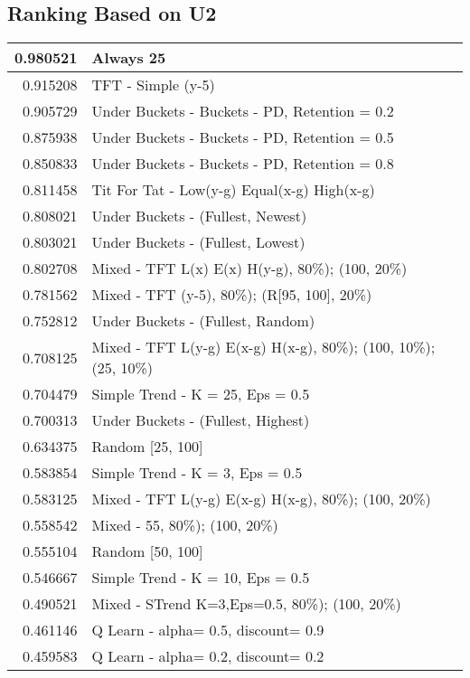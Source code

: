\begin{table}[!hbtp]
\subsection{Ranking Based on U2}
\begin{footnotesize}
\begin{tabular}{|r|l|}\hline  \label{U3results}
0.980521 & Always 25\\ \hline
0.915208 & TFT - Simple (y-5)\\ \hline
0.905729 & Under Buckets - Buckets - PD, Retention = 0.2\\ \hline
0.875938 & Under Buckets - Buckets - PD, Retention = 0.5\\ \hline
0.850833 & Under Buckets - Buckets - PD, Retention = 0.8\\ \hline
0.811458 & Tit For Tat - Low(y-g) Equal(x-g) High(x-g)\\ \hline
0.808021 & Under Buckets - (Fullest, Newest)\\ \hline
0.803021 & Under Buckets - (Fullest, Lowest)\\ \hline
0.802708 & Mixed - {TFT L(x) E(x) H(y-g), 80\%); (100, 20\%)}\\ \hline
0.781562 & Mixed - {TFT (y-5), 80\%); (R[95, 100], 20\%)}\\ \hline
0.752812 & Under Buckets - (Fullest, Random)\\ \hline
0.708125 & Mixed - {TFT L(y-g) E(x-g) H(x-g), 80\%); (100, 10\%); (25, 10\%)}\\ \hline
0.704479 & Simple Trend - K = 25, Eps = 0.5\\ \hline
0.700313 & Under Buckets - (Fullest, Highest)\\ \hline
0.634375 & Random [25, 100]\\ \hline
0.583854 & Simple Trend - K = 3, Eps = 0.5\\ \hline
0.583125 & Mixed - {TFT L(y-g) E(x-g) H(x-g), 80\%); (100, 20\%)}\\ \hline
0.558542 & Mixed - {55, 80\%); (100, 20\%)}\\ \hline
0.555104 & Random [50, 100]\\ \hline
0.546667 & Simple Trend - K = 10, Eps = 0.5\\ \hline
0.490521 & Mixed - {STrend K=3,Eps=0.5, 80\%); (100, 20\%)}\\ \hline
0.461146 & Q Learn - alpha= 0.5, discount= 0.9\\ \hline
0.459583 & Q Learn - alpha= 0.2, discount= 0.2\\ \hline

\end{tabular}
\end{footnotesize}
\end{table}

